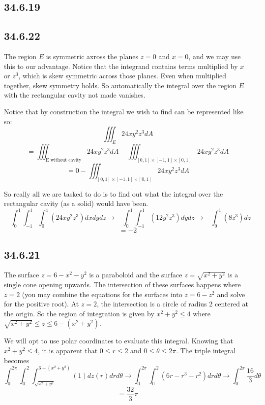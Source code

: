 \documentclass{article}
\begin{document}
\subsection{34.6.19}

\subsection{34.6.22}

The region $E$ is symmetric axross the planes $z=0$ and $x = 0$, and we may use this to our advantage. Notice that the integrand contains terms multiplied by $x$ or $z^3$, which is skew symmetric across those planes. Even when multiplied together, skew symmetry holds. So automatically the integral over the region $E$ with the rectangular cavity not made vanishes.

Notice that by construction the integral we wish to find can be represented like so:
$$\iiint_E 24xy^2z^3 dA$$
$$ = \iiint_{\text{E without cavity}}24xy^2z^3 dA - \iiint_{[0,1]\times[-1,1]\times[0,1]}24xy^2z^3 dA$$
$$ = 0 - \iiint_{[0,1]\times[-1,1]\times[0,1]}24xy^2z^3 dA$$

So really all we are tasked to do is to find out what the integral over the rectangular cavity (as a solid) would have been.
$$-\int_{0}^{1}\int_{-1}^{1}\int_{0}^{1}(24xy^2z^3)dxdydz \to -\int_{0}^{1}\int_{-1}^{1} (12y^2z^3)dydz \to -\int_{0}^{1} (8z^3)dz$$
$$= -2$$

\subsection{34.6.21}

The surface $z = 6-x^2-y^2$ is a paraboloid and the surface $z = \sqrt{x^2+y^2}$ is a single cone opening upwards. The intersection of these surfaces happens where $z=2$ (you may combine the equations for the surfaces into $z=6-z^2$ and solve for the positive root). At $z=2$, the intersection is a circle of radius $2$ centered at the origin. So the region of integration is given by $x^2+y^2 \leq 4$ where $\sqrt{x^2+y^2} \leq z \leq 6-(x^2+y^2)$.

We will opt to use polar coordinates to evaluate this integral. Knowing that $x^2+y^2\leq 4$, it is apparent that $0\leq r \leq 2$ and $0 \leq \theta \leq 2\pi$. The triple integral becomes $$\int_{0}^{2\pi}\int_{0}^{2}\int_{\sqrt{x^2+y^2}}^{6-(x^2+y^2)} (1) dz(r)drd\theta \to \int_{0}^{2\pi}\int_{0}^{2} (6r-r^3-r^2)drd\theta \to \int_0^{2\pi}\frac{16}{3}d\theta $$
$$= \frac{32}{3}\pi$$
\end{document}
